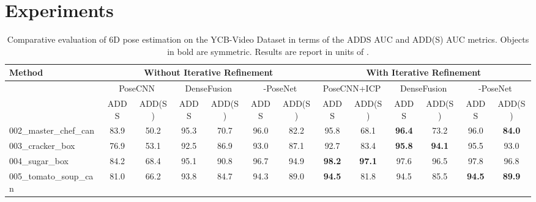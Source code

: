 \documentclass[letterpaper, 10 pt, conference]{ieeeconf}
\begin{document}
\section{Experiments}


\begin{table*}[t]
\begin{center}
\caption{Comparative evaluation of 6D pose estimation on the YCB-Video Dataset in terms of the ADDS AUC and ADD(S) AUC metrics. Objects in bold are symmetric. Results are report in units of .}
\resizebox{0.9\textwidth}{!}
		{
\begin{tabular}{l|c|c|c|c|c|c||c|c|c|c|c|c} 
\hline
Method                             & \multicolumn{6}{c||}{Without Iterative Refinement}                                                & \multicolumn{6}{c}{With Iterative Refinement}                                                         \\ 
\hline
\multicolumn{1}{c|}{}              & \multicolumn{2}{c|}{PoseCNN \cite{xiang2017posecnn}} & \multicolumn{2}{c|}{DenseFusion \cite{wang2019densefusion}} & \multicolumn{2}{c||}{-PoseNet} & \multicolumn{2}{c|}{PoseCNN+ICP \cite{xiang2017posecnn}} & \multicolumn{2}{c|}{DenseFusion \cite{wang2019densefusion}} & \multicolumn{2}{c}{-PoseNet}   \\ 
\hline
\multicolumn{1}{c|}{}              & ADDS & ADD(S)                & ADDS & ADD(S)                    & ADDS & ADD(S)                  & ADDS           & ADD(S)          & ADDS           & ADD(S)          & ADDS\textbf{ } & ADD(S)         \\ 
\hline
002\_master\_chef\_can             & 83.9 & 50.2                  & 95.3 & 70.7                      & 96.0 & 82.2                    & 95.8           & 68.1            & \textbf{96.4} & 73.2            & 96.0           & \textbf{84.0}  \\
003\_cracker\_box                  & 76.9 & 53.1                  & 92.5 & 86.9                      & 93.0 & 87.1                    & 92.7           & 83.4            & \textbf{95.8} & \textbf{94.1}  & 95.5           & 93.0           \\
004\_sugar\_box                    & 84.2 & 68.4                  & 95.1 & 90.8                      & 96.7 & 94.9                    & \textbf{98.2} & \textbf{97.1}  & 97.6           & 96.5            & 97.8           & 96.8           \\
005\_tomato\_soup\_can             & 81.0 & 66.2                  & 93.8 & 84.7                      & 94.3 & 89.0                    & \textbf{94.5} & 81.8            & 94.5           & 85.5            & \textbf{94.5}  & \textbf{89.9}  \\

\end{tabular}}
\end{center}
\end{table*}
\end{document}

